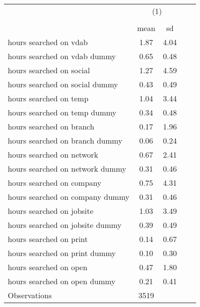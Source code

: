 {
\def\sym#1{\ifmmode^{#1}\else\(^{#1}\)\fi}
\begin{tabular}{l*{1}{cccc}}
\hline\hline
                    &\multicolumn{2}{c}{(1)}  \\
                    &\multicolumn{2}{c}{}     \\
                    &        mean&          sd\\
\hline
 hours searched on vdab&        1.87&        4.04\\
 hours searched on vdab dummy&        0.65&        0.48\\
 hours searched on social&        1.27&        4.59\\
 hours searched on social dummy&        0.43&        0.49\\
 hours searched on temp&        1.04&        3.44\\
 hours searched on temp dummy&        0.34&        0.48\\
 hours searched on branch&        0.17&        1.96\\
 hours searched on branch dummy&        0.06&        0.24\\
 hours searched on network&        0.67&        2.41\\
 hours searched on network dummy&        0.31&        0.46\\
 hours searched on company&        0.75&        4.31\\
 hours searched on company dummy&        0.31&        0.46\\
 hours searched on jobsite&        1.03&        3.49\\
 hours searched on jobsite dummy&        0.39&        0.49\\
 hours searched on print&        0.14&        0.67\\
 hours searched on print dummy&        0.10&        0.30\\
 hours searched on open&        0.47&        1.80\\
 hours searched on open dummy&        0.21&        0.41\\
\hline
Observations        &        3519&            \\
\hline\hline
\end{tabular}
}

